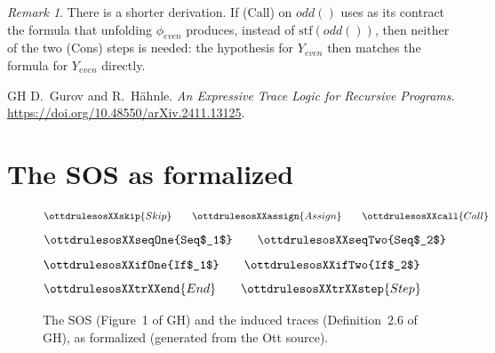 \documentclass[11pt]{article}
\newcommand{\stf}{\mathrm{stf}}
\newcommand{\call}[1]{#1()}
\newcommand{\GH}[1]{#1 of GH}
\theoremstyle{plain}
\theoremstyle{definition}
\theoremstyle{remark}
\newtheorem{remark}[theorem]{Remark}
\begin{document}
\begin{remark}\label{rem:short}
  There is a shorter derivation. If (Call) on $\call{\mathit{odd}}$ uses as
  its contract the formula that unfolding $\phi_{\mathit{even}}$ produces,
  instead of $\stf(\call{\mathit{odd}})$, then neither of the two (Cons)
  steps is needed: the hypothesis for $Y_{\mathit{even}}$ then matches the
  formula for $Y_{\mathit{even}}$ directly.
\end{remark}

\begin{thebibliography}{GH}
 D.~Gurov and R.~H\"ahnle. \emph{An Expressive Trace Logic
  for Recursive Programs}.
  \url{https://doi.org/10.48550/arXiv.2411.13125}.
\end{thebibliography}

\appendix
\section{The SOS as formalized}

\begin{figure}[h]
  \small
  \[
    \ottdrulesosXXskip{Skip} \qquad
    \ottdrulesosXXassign{Assign} \qquad
    \ottdrulesosXXcall{Call}
  \]
  \[
    \ottdrulesosXXseqOne{Seq$_1$} \qquad
    \ottdrulesosXXseqTwo{Seq$_2$}
  \]
  \[
    \ottdrulesosXXifOne{If$_1$} \qquad
    \ottdrulesosXXifTwo{If$_2$}
  \]
  \[
    \ottdrulesosXXtrXXend{End} \qquad
    \ottdrulesosXXtrXXstep{Step}
  \]
  \caption{The SOS (\GH{Figure~1}) and the induced traces
    (\GH{Definition~2.6}), as formalized (generated from the Ott source).}
  \label{fig:sos}
\end{figure}
\end{document}
